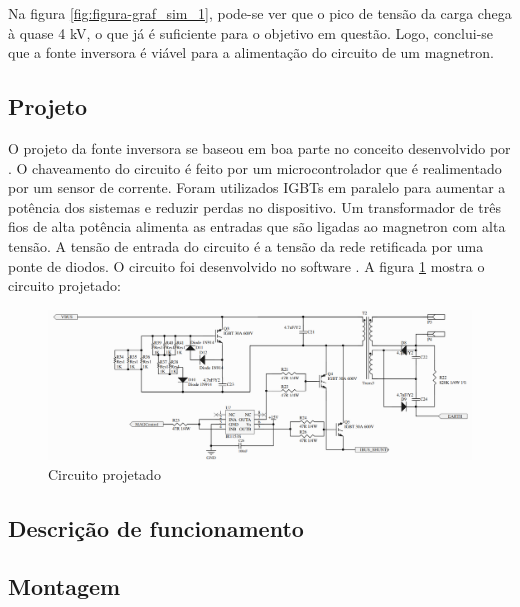 Na figura \ref{fig:figura-graf_sim_1}, pode-se ver que o pico de tensão da carga chega à quase 4 kV, o que já é suficiente para o objetivo em questão. Logo, conclui-se que a fonte inversora é viável para a alimentação do circuito de um magnetron.

\subsection{Projeto}

O projeto da fonte inversora se baseou em boa parte no conceito desenvolvido por . O chaveamento do circuito é feito por um microcontrolador que é realimentado por um sensor de corrente. Foram utilizados IGBTs em paralelo para aumentar a potência dos sistemas e reduzir perdas no dispositivo. Um transformador de três fios de alta potência alimenta as entradas que são ligadas ao magnetron com alta tensão. A tensão de entrada do circuito é a tensão da rede retificada por uma ponte de diodos. O circuito foi desenvolvido no software . A figura \ref{fig:proj-font-inv} mostra o circuito projetado:

\begin{figure}[!htb]
    \centering
    \includegraphics[width=1.1\textwidth]{./dados/figuras/proj-font-inv}
    \caption{Circuito projetado}
    \label{fig:proj-font-inv}
\end{figure}

\subsection{Descrição de funcionamento}

\subsection{Montagem}


\section{}
\label{sec:font}

